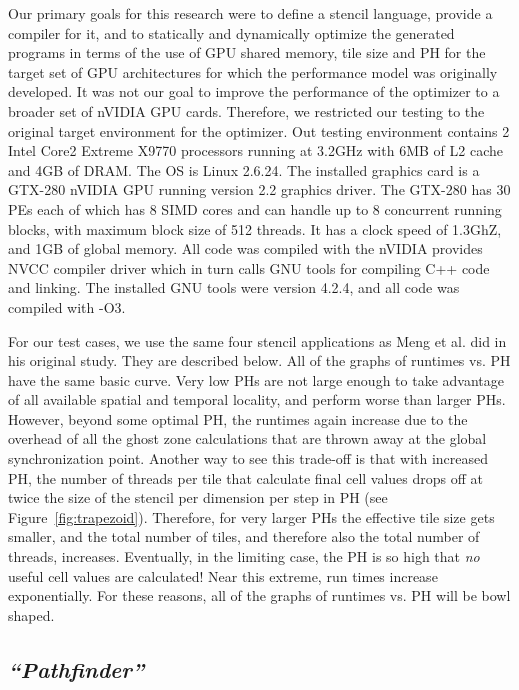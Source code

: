 \documentclass{styles/sig-alternate}
\begin{document}
Our primary goals for this research were to define a stencil language, provide a compiler for it, 
and to statically and dynamically optimize the generated programs in terms of the use of GPU shared memory, 
tile size and PH for the target set of GPU architectures for which the performance model was 
originally developed.  It was not our goal to improve the performance of the optimizer to a broader set of 
nVIDIA GPU cards.  Therefore, we restricted our testing to the original target environment for the optimizer.
Out testing environment contains 2 Intel Core2 Extreme X9770 processors running at 3.2GHz with 6MB of L2 cache 
and 4GB of DRAM.  The OS is Linux 2.6.24.  The installed graphics card is a GTX-280 nVIDIA GPU running 
version 2.2 graphics driver.  The GTX-280 has 30 PEs each of which has 8 SIMD cores and can handle up to 8 
concurrent running blocks, with maximum block size of 512 threads.  It has a clock speed of 1.3GhZ, and 1GB of
global memory.  All code was compiled with the nVIDIA provides NVCC compiler driver which in turn 
calls GNU tools for compiling C++ code and linking.  The installed GNU tools were version 4.2.4, and all code was
compiled with -O3.

For our test cases, we use the same four stencil applications as Meng et al. did in his original study.  
They are described below.
All of the graphs of runtimes vs. PH have the same basic curve.  Very low PHs are not
large enough to take advantage of all available spatial and temporal locality, and perform worse than larger
PHs.  However, beyond some optimal PH, the runtimes again increase due to the overhead
of all the ghost zone calculations that are thrown away at the global synchronization point.  Another way to
see this trade-off is that with increased PH, the number of threads per tile that calculate final cell 
values drops off at twice the size of the stencil per dimension per step in PH (see Figure~\ref{fig:trapezoid}).  Therefore, 
for very larger PHs the effective tile size gets smaller, and the total number of tiles, and therefore
also the total number of threads, increases.  Eventually, in the limiting case, the PH is so high that 
{\em no} useful cell values are calculated!  Near this extreme, run times increase exponentially.  For these reasons, all of the graphs
of runtimes vs. PH will be bowl shaped.

\subsection{\em ``Pathfinder''}
\end{document}
